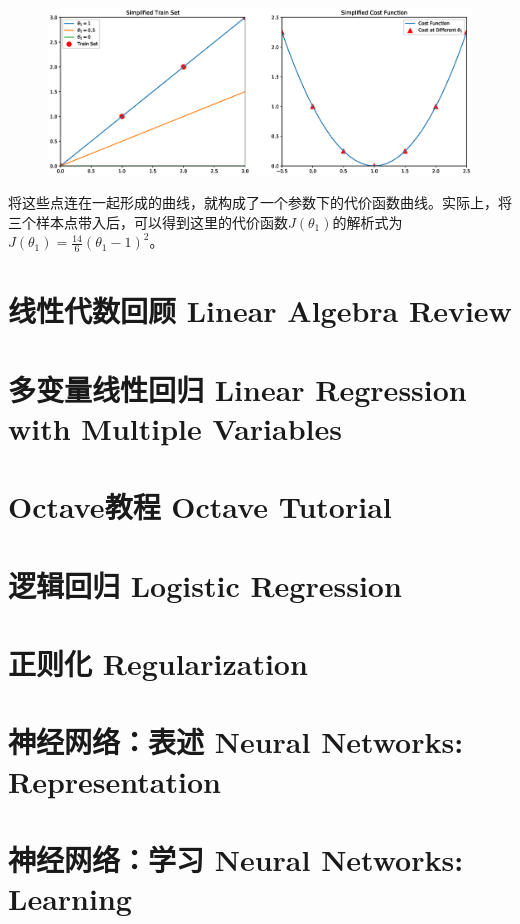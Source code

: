 \documentclass[12pt, a4paper]{article}
\begin{document}
            \begin{figure}[H]
                \includegraphics[width=1\textwidth]{OneParameterCostFunction.eps}
            \end{figure}

            将这些点连在一起形成的曲线，就构成了一个参数下的代价函数曲线。实际上，将三个样本点带入后，可以得到这里的代价函数$J(\theta_1)$的解析式为$J(\theta_1)=\frac{14}{6}(\theta_1-1)^2$。

            


    \section{线性代数回顾 Linear Algebra Review}

    \section{多变量线性回归 Linear Regression with Multiple Variables}

    \section{Octave教程 Octave Tutorial}

    \section{逻辑回归 Logistic Regression}

    \section{正则化 Regularization}

    \section{神经网络：表述 Neural Networks: Representation}

    \section{神经网络：学习 Neural Networks: Learning}
    
\end{document}
